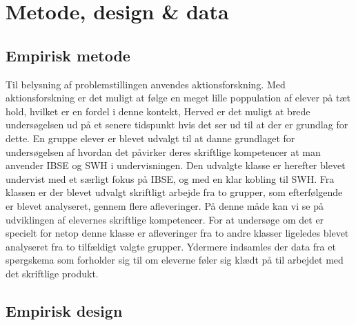 \chapter{Metode, design \& data}
\label{Ch:3}


\section{Empirisk metode}
\label{sec:3.0}
Til belysning af problemstillingen anvendes aktionsforskning. Med aktionsforskning er det muligt at følge en meget lille poppulation af elever på tæt hold, hvilket er en fordel i denne kontekt, Herved er det muligt at brede undersøgelsen ud på et senere tidspunkt hvis det ser ud til at der er grundlag for dette. En gruppe elever er blevet udvalgt til at danne grundlaget for undersøgelsen af hvordan det påvirker deres skriftlige kompetencer at man anvender IBSE og SWH i undervisningen. 
Den udvalgte klasse er herefter blevet undervist med et særligt fokus på IBSE, og med en klar kobling til SWH. Fra klassen er der blevet udvalgt skriftligt arbejde fra to grupper, som efterfølgende er blevet analyseret, gennem flere afleveringer. På denne måde kan vi se på udviklingen af elevernes skriftlige kompetencer. For at undersøge om det er specielt for netop denne klasse er afleveringer fra to andre klasser ligeledes blevet analyseret fra to tilfældigt valgte grupper. 
Ydermere indsamles der data fra et spørgskema som forholder sig til om eleverne føler sig klædt på til arbejdet med det skriftlige produkt.


\section{Empirisk design}
\label{sec:3.1}


